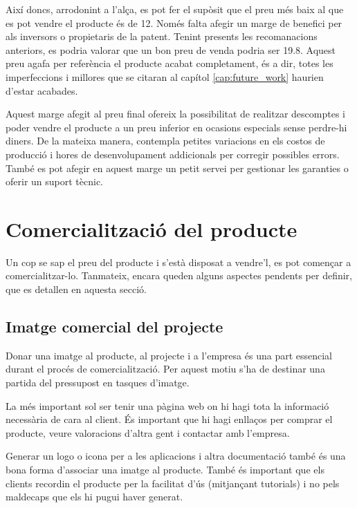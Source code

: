 Així doncs, arrodonint a l'alça, es pot fer el supòsit que el preu més baix al
que es pot vendre el producte és de
\SI[round-mode=places,round-precision=0]{12}{\EUR}. Només falta afegir un marge
de benefici per als inversors o propietaris de la patent.
Tenint presents les recomanacions anteriors, es podria valorar que
un bon preu de venda podria ser
\SI{19.8}{\EUR}. Aquest preu agafa per referència el
producte acabat completament, és a dir, totes les imperfeccions i millores que
se citaran al capítol \ref{cap:future_work} haurien d'estar acabades.

Aquest marge afegit al preu final ofereix la possibilitat de realitzar
descomptes i poder vendre el producte a un preu inferior en ocasions especials
sense perdre-hi diners. De la mateixa manera, contempla petites variacions en
els costos de producció i hores de desenvolupament addicionals per corregir
possibles errors. També es pot afegir en aquest marge un petit servei per
gestionar les garanties o oferir un suport tècnic.

\section{Comercialització del producte}

Un cop se sap el preu del producte i s'està disposat a vendre'l, es pot
començar a comercialitzar-lo. Tanmateix, encara queden alguns aspectes pendents
per definir, que es detallen en aquesta secció.

\subsection{Imatge comercial del projecte}

Donar una imatge al producte, al projecte i a l'empresa és una part essencial
durant el procés de comercialització. Per aquest motiu s'ha de destinar una
partida del pressupost en tasques d'imatge.

La més important sol ser tenir una pàgina web on hi hagi tota la informació
necessària de cara al client. És important que hi hagi enllaços per comprar el
producte, veure valoracions d'altra gent i contactar amb l'empresa.

Generar un logo o icona per a les aplicacions i altra documentació també és una
bona forma d'associar una imatge al producte. També és important que els clients
recordin el producte per la facilitat d'ús (mitjançant tutorials) i no pels
maldecaps que els hi pugui haver generat.

